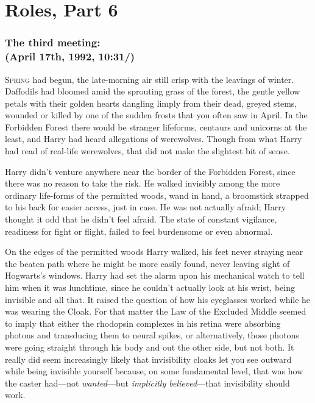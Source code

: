 \chapter{Roles, Part 6}

\subsection{The third meeting:\\
(April 17th, 1992, 10:31\AM/)}

\lettrine{S}{pring} had begun, the late-morning air still crisp with the leavings of winter.
Daffodils had bloomed amid the sprouting grass of the forest, the gentle yellow
petals with their golden hearts dangling limply from their dead, greyed stems,
wounded or killed by one of the sudden frosts that you often saw in April. In
the Forbidden Forest there would be stranger lifeforms, centaurs and unicorns
at the least, and Harry had heard allegations of werewolves. Though from what
Harry had read of real-life werewolves, that did not make the slightest bit of
sense.

Harry didn't venture anywhere near the border of the Forbidden Forest, since
there was no reason to take the risk. He walked invisibly among the more
ordinary life-forms of the permitted woods, wand in hand, a broomstick strapped
to his back for easier access, just in case. He was not actually afraid; Harry
thought it odd that he didn't feel afraid. The state of constant vigilance,
readiness for fight or flight, failed to feel burdensome or even abnormal.

On the edges of the permitted woods Harry walked, his feet never straying near
the beaten path where he might be more easily found, never leaving sight of
Hogwarts's windows. Harry had set the alarm upon his mechanical watch to tell
him when it was lunchtime, since he couldn't actually look at his wrist, being
invisible and all that. It raised the question of how his eyeglasses worked
while he was wearing the Cloak. For that matter the Law of the Excluded Middle
seemed to imply that either the rhodopsin complexes in his retina were
absorbing photons and transducing them to neural spikes, or alternatively,
those photons were going straight through his body and out the other side, but
not both. It really did seem increasingly likely that invisibility cloaks let
you see outward while being invisible yourself because, on some fundamental
level, that was how the caster had---not \emph{wanted}---but \emph{implicitly
believed}---that invisibility should work.

